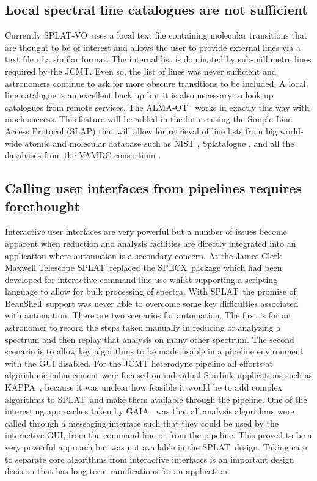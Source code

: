 \documentclass[final,authoryear,5p,times,twocolumn]{elsarticle}
\newcommand{\splat}{\textsf{\small SPLAT}}
\newcommand{\splatvo}{{\textsf{\small{SPLAT-VO}}}}
\newcommand{\gaia}{\textsf{\small GAIA}}
\newcommand{\KAPPA}{\textsf{\small KAPPA}}
\newcommand{\specx}{\textsf{\small SPECX}}
\newcommand{\Starlink}{\textsf{\small Starlink}}
\newcommand{\almaot}{\textsf{\small ALMA-OT}}
\newcommand{\beanshell}{\textsf{\small BeanShell}}
\newcommand{\ascl}[1]{\href{http://www.ascl.net/#1}{ascl:#1}}
\begin{document}
\subsection{Local spectral line catalogues are not sufficient}

Currently \splatvo\ uses a local text file containing molecular
transitions that are thought to be of interest and allows the user to
provide external lines via a text file of a similar format. The
internal list is dominated by sub-millimetre lines required by the
JCMT. Even so, the list of lines was never sufficient and astronomers
continue to ask for more obscure transitions to be included. A local
line catalogue is an excellent back up but it is also necessary to
look up catalogues from remote services. The \almaot\ 
\citep{2013ASPC..475..373W} works in exactly this way with much
success. This feature will be added in the future using the Simple
Line Access Protocol (SLAP) that will allow for retrieval of line
lists from big world-wide atomic and molecular database such as NIST
\citep{NIST_ASD,2012APS..DMP.D1004K,2004JPCRD..33..177L},
Splatalogue \citep{2010AAS...21547905R}, and all the
databases from the VAMDC consortium \citep{2011BaltA..20..503K}.


\subsection{Calling user interfaces from pipelines requires forethought}

Interactive user interfaces are very powerful but a number of issues
become apparent when reduction and analysis facilities are directly
integrated into an application where automation is a secondary
concern.  At the James Clerk Maxwell Telescope \splat\ replaced the
\specx\ package \citep[][\ascl{1310.008}]{specx} which had been
developed for interactive command-line use whilst supporting a
scripting language to allow for bulk processing of spectra. With \splat\
the promise of \beanshell\ support was never able to overcome some key
difficulties associated with automation. There are two scenarios for
automation. The first is for an astronomer to record the steps taken
manually in reducing or analyzing a spectrum and then replay that
analysis on many other spectrum. The second scenario is to allow key
algorithms to be made usable in a pipeline environment with the GUI
disabled. For the JCMT heterodyne pipeline
\citep[][\ascl{1310.001}]{2008ASPC..394..565J,JennessACSISDR} all efforts at algorithmic
enhancement were focused on individual \Starlink\ applications such as
\KAPPA\ \citep[][\ascl{1403.022}]{sun95}, because it was unclear how
feasible it would be to add complex algorithms to \splat\ and make them
available through the pipeline. One of the interesting approaches
taken by \gaia\ \citep{2009ASPC..411..575D} was that all analysis
algorithms were called through a messaging interface such that they
could be used by the interactive GUI, from the command-line or from
the pipeline. This proved to be a very powerful approach but was not
available in the \splat\ design. Taking care to separate core algorithms
from interactive interfaces is an important design decision that has
long term ramifications for an application.
\end{document}
